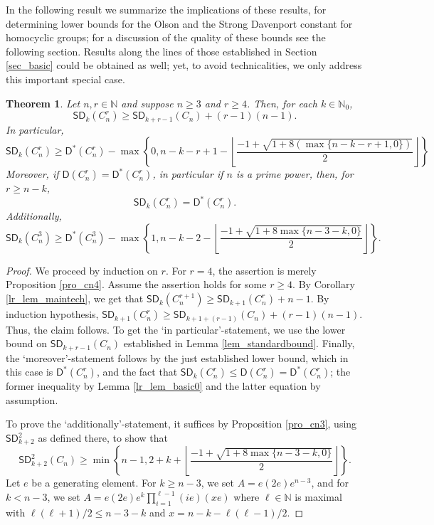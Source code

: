 \documentclass{amsart}
\newtheorem{thm}{Theorem}[section]
\theoremstyle{definition}
\numberwithin{equation}{section}
\begin{document}
In the following result we summarize the implications
of these results, for determining lower bounds for the Olson and the Strong Davenport constant for homocyclic groups; for a discussion of the quality of these bounds see the following section.
Results along the lines of those established in Section \ref{sec_basic}
could be obtained as well; yet, to avoid technicalities,
we only address this important special case.

\begin{thm}
\label{thm_homocyclic}
Let $n,r\in \mathbb{N}$ and suppose $n \ge 3$ and $r\ge 4$.
Then, for each $k\in \mathbb{N}_0$,
\[{\mathsf{SD}}_k(C_n^r)\ge {\mathsf{SD}}_{k+r-1}(C_n) + (r-1)(n-1).
\]
In particular,
\[{\mathsf{SD}}_k(C_n^r) \ge
{\mathsf{D}^{\ast}}(C_n^r) -  \max \left \{0,n - k-r+1  - \left\lfloor \frac{-1 + \sqrt{1 + 8(\max\{n-k-r+1,0\})}}{2} \right \rfloor \right \}
\]
Moreover, if ${\mathsf{D}}(C_n^r) = {\mathsf{D}^{\ast}}(C_n^r)$, in particular if $n$ is a prime power,
then, for $r \ge n-k$,
\[
{\mathsf{SD}}_k(C_n^r) = {\mathsf{D}^{\ast}}(C_n^r).
\]
Additionally,
\[{\mathsf{SD}}_k(C_n^3)\ge {\mathsf{D}^{\ast}}(C_n^3) - \max \left\{1,n -k-2- \left\lfloor \frac{-1 + \sqrt{1+ 8\max\{n-3-k, 0\}}}{2} \right\rfloor \right\}.\]
\end{thm}
\begin{proof}
We proceed by induction on $r$.
For $r=4$, the assertion is merely Proposition \ref{pro_cn4}.
Assume the assertion holds for some $r\ge 4$.
By Corollary \ref{lr_lem_maintech}, we get that ${\mathsf{SD}}_{k}(C_n^{r+1})\ge {\mathsf{SD}}_{k+1}(C_n^r)+n-1$.
By induction hypothesis, ${\mathsf{SD}}_{k+1}(C_n^r)\ge {\mathsf{SD}}_{k+1+(r-1)}(C_n)+(r-1)(n-1)$.
Thus, the claim follows.
To get the `in particular'-statement, we use the lower bound
on ${\mathsf{SD}}_{k+r-1}(C_n)$ established in Lemma \ref{lem_standardbound}.
Finally, the `moreover'-statement follows by the just established lower bound,
which in this case is ${\mathsf{D}^{\ast}}(C_n^r)$,
and the fact that ${\mathsf{SD}}_{k}(C_n^r)\le {\mathsf{D}}(C_n^r)={\mathsf{D}^{\ast}}(C_n^r)$; the former
inequality by Lemma \ref{lr_lem_basic0} and the latter equation by assumption.

To prove the `additionally'-statement, it suffices by Proposition \ref{pro_cn3}, using ${\mathsf{SD}}_{k+2}^{2}$ as defined there, to show that
\[{\mathsf{SD}}_{k+2}^{2}(C_n) \ge \min \left \{ n-1, 2+k+ \left\lfloor \frac{-1 + \sqrt{1+ 8\max\{n-3-k, 0\}}}{2} \right\rfloor \right\}.\]
Let $e$ be a generating element.
For $k \ge n-3$, we set $A= e(2e)e^{n-3}$,
and for $k<n-3$, we set $A=e(2e)e^k \prod_{i=1}^{\ell-1}(ie)(xe)$
where $\ell\in \mathbb{N}$ is maximal with $\ell (\ell + 1)/2 \le n-3 - k$ and $x=n - k- \ell (\ell - 1)/2$.
\end{proof}
\end{document}

